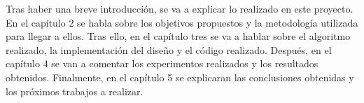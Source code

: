 Tras haber una breve introducción, se va a explicar lo realizado en este proyecto. En el capítulo 2 se habla sobre los objetivos propuestos y la metodología utilizada para llegar a ellos. Tras ello, en el capítulo tres se va a hablar sobre el algoritmo realizado, la implementación del diseño y el código realizado. Después, en el capítulo 4 se van a comentar los experimentos realizados y los resultados obtenidos. Finalmente, en el capítulo 5 se explicaran las conclusiones obtenidas y los próximos trabajos a realizar.






























